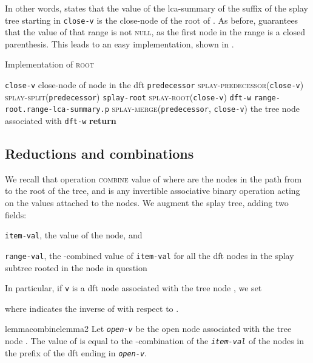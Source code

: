 \documentclass[a4paper,USenglish]{lipics}
\newcommand{\var}[1]{\textrm{\texttt{#1}}}
\begin{document}
			
In other words,  states that the  value of the lca-summary of the suffix of the splay tree starting in \var{close-v} is the close-node of the root of . As before,  guarantees that the  value of that range is not \textsc{null}, as the first node in the range is a closed parenthesis. This leads to an easy implementation, shown in .

			\begin{algorithm}[H]
			  \small
			  \caption{\small Implementation of \textsc{root}}
			  \label{algo:root}
			  \begin{algorithmic}[1]
					\State \var{close-v}  close-node of node  in the dft
				    \State \var{predecessor}  \textsc{splay-predecessor}(\var{close-v})
				    \State \textsc{splay-split}(\var{predecessor})
				    \State \var{splay-root}  \textsc{splay-root}(\var{close-v})
				    \State \var{dft-w}  \var{range-root.range-lca-summary.p}
				    \State \textsc{splay-merge}(\var{predecessor}, \var{close-v})
				    \State   the tree node associated with \var{dft-w}
				    \State \textbf{return} 
			    \EndProcedure
			  \end{algorithmic}
			\end{algorithm}

			
		\subsection{Reductions and combinations}
\label{sub:combine}
			
			We recall that operation \textsc{combine}  value of 
			where  are the nodes in the path from  to the root of the tree, and  is any invertible associative binary operation acting on the values attached to the nodes. We augment the splay tree, adding two fields:
			\begin{compactitem}
				\item \var{item-val}, the value of the node, and
				\item \var{range-val}, the -combined value of \var{item-val} for all the dft nodes in the splay subtree rooted in the node in question
			\end{compactitem}
			In particular, if \var{v} is a dft node associated with the tree node , we set
			
			where  indicates the inverse of  with respect to .
			\begin{restatable}{lemma}{combinelemma2}
				\label{prop:combine}
Let \emph{\var{open-v}} be the open node associated with the tree node . The value of 
				is equal to the -combination of the \emph{\var{item-val}} of the nodes in the prefix of the dft ending in \emph{\var{open-v}}.
			\end{restatable}
			
\end{document}
